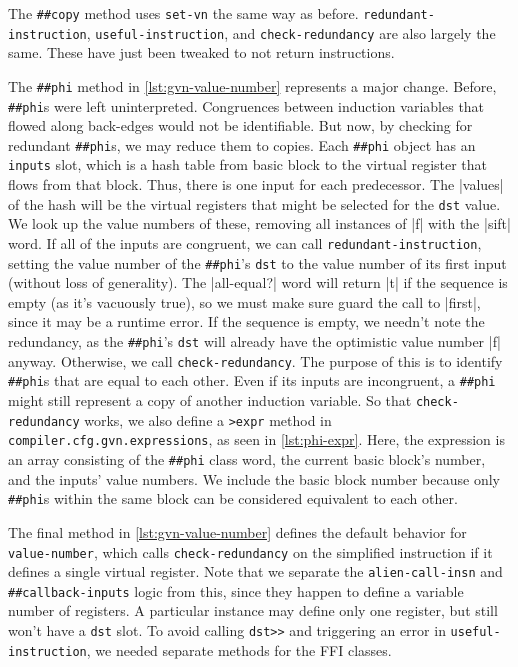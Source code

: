 The \Verb|##copy| method uses \Verb|set-vn| the same way as before.
\Verb|redundant-instruction|, \Verb|useful-instruction|, and
\Verb|check-redundancy| are also largely the same.  These have just been
tweaked to not return instructions.

The \Verb|##phi| method in \vref{lst:gvn-value-number} represents a major
change. Before, \Verb|##phi|s were left uninterpreted.  Congruences between
induction variables that flowed along back-edges would not be identifiable.
But now, by checking for redundant \Verb|##phi|s, we may reduce them to copies.
Each \Verb|##phi| object has an \Verb|inputs| slot, which is a hash table from
basic block to the virtual register that flows from that block.  Thus, there is
one input for each predecessor.  The \factor|values| of the hash will be the
virtual registers that might be selected for the \Verb|dst| value.  We look up
the value numbers of these, removing all instances of \factor|f| with the
\factor|sift| word.  If all of the inputs are congruent, we can call
\Verb|redundant-instruction|, setting the value number of the \Verb|##phi|'s
\Verb|dst| to the value number of its first input (without loss of generality).
The \factor|all-equal?| word will return \factor|t| if the sequence is empty
(as it's vacuously true), so we must make sure guard the call to
\factor|first|, since it may be a runtime error.  If the sequence is empty, we
needn't note the redundancy, as the \Verb|##phi|'s \Verb|dst| will already have
the optimistic value number \factor|f| anyway.  Otherwise, we call
\Verb|check-redundancy|.  The purpose of this is to identify \Verb|##phi|s that
are equal to each other.  Even if its inputs are incongruent, a \Verb|##phi|
might still represent a copy of another induction variable.  So that
\Verb|check-redundancy| works, we also define a \Verb|>expr| method in
\Verb|compiler.cfg.gvn.expressions|, as seen in \vref{lst:phi-expr}.  Here, the
expression is an array consisting of the \Verb|##phi| class word, the current
basic block's number, and the inputs' value numbers.  We include the basic
block number because only \Verb|##phi|s within the same block can be considered
equivalent to each other.


\begin{sloppypar}
The final method in \vref{lst:gvn-value-number} defines the default behavior
for \Verb|value-number|, which calls \Verb|check-redundancy| on the simplified
instruction if it defines a single virtual register.  Note that we separate the
\Verb|alien-call-insn| and \Verb|##callback-inputs| logic from this, since they
happen to define a variable number of registers.  A particular instance may
define only one register, but still won't have a \Verb|dst| slot.  To avoid
calling \Verb|dst>>| and triggering an error in \Verb|useful-instruction|, we
needed separate methods for the \gls{FFI} classes.
\end{sloppypar}

